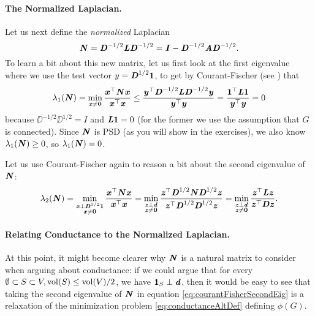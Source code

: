 \paragraph{The Normalized Laplacian.} Let us next define the \emph{normalized} Laplacian \[
\NN = \DD^{-1/2} \LL \DD^{-1/2} = \II -  \DD^{-1/2} \AA \DD^{-1/2}.
\]
To learn a bit about this new matrix, let us first look at the first eigenvalue where we use the test vector $y = \DD^{1/2}\vecone$, to get by Courant-Fischer (see ) that
\begin{align}\label{eq:plugInNormalizedVector}
    \lambda_1(\NN) =
    \min_{
      \substack{ \xx \neq \veczero}
    }
    \frac{\xx^\trp \NN\xx}{\xx^\trp\xx}  \leq \frac{\yy^\trp\DD^{-1/2} \LL \DD^{-1/2} \yy}{\yy^\trp\yy} = \frac{\vecone^\trp \LL \vecone}{\yy^\trp\yy} = 0
\end{align}
because $\DD^{-1/2} \DD^{1/2} = I$ and $\LL \vecone = 0$ (for the former we use the assumption that $G$ is connected). Since $\NN$ is PSD (as you will show in the exercises), we also know $\lambda_1(\NN) \geq 0$, so $\lambda_1(\NN) = 0$.

Let us use Courant-Fischer again to reason a bit about the second eigenvalue of $\NN$:
\begin{align}\label{eq:courantFisherSecondEig}
    \lambda_2(\NN) =
    \min_{
      \substack{ \xx \perp \DD^{1/2}\vecone \\ \xx \neq \veczero}
    }
    \frac{\xx^\trp \NN\xx}{\xx^\trp\xx} = 
    \min_{
      \substack{ \zz \perp \dd \\ \zz \neq \veczero}
    }
    \frac{\zz^\trp \DD^{1/2}  \NN \DD^{1/2} \zz}{\zz^\trp \DD^{1/2}\DD^{1/2}\zz} = \min_{
      \substack{ \zz \perp \dd \\ \zz \neq \veczero}
    } \frac{\zz^\trp \LL \zz}{\zz^\trp \DD \zz}.
\end{align}

\paragraph{Relating Conductance to the Normalized Laplacian.} At this point, it might become clearer why $\NN$ is a natural matrix to consider when arguing about conductance: if we could argue that for every $\emptyset \subset S \subset V, \vol(S) \leq \vol(V)/2$, we have $\vecone_S \perp \dd$, then it would be easy to see that taking the second eigenvalue of $\NN$ in equation \ref{eq:courantFisherSecondEig} is a relaxation of the minimization problem \ref{eq:conductanceAltDef} defining $\phi(G)$.

